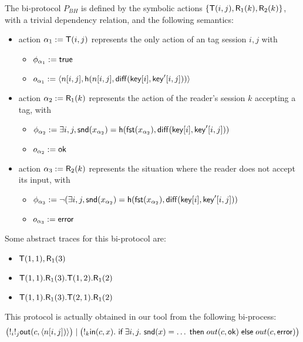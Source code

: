 \begin{example}
  \label{ex:basic-hash-bi-process}
  The bi-protocol $P_{BH}$ is defined by the symbolic actions
  $\{\textsf{T}(i,j),\textsf{R}_1(k),\textsf{R}_2(k)\}$, with a trivial dependency relation,
  and the following semantics:
    \begin{itemize}
      \item action $\alpha_1 := \textsf{T}(i,j)$ represents the only
        action of an tag session $i,j$ with
        \begin{itemize}
          \item $\phi_{\alpha_1} := \textsf{true}$
          \item $o_{\alpha_1} := \langle n[i,j], \mathsf{h}(n[i,j],\mathsf{diff}(\mathsf{key}[i],\mathsf{key}'[i,j])) \rangle$
        \end{itemize}
      \item action $\alpha_2 := \textsf{R}_1(k)$ represents the action
        of the reader's session $k$ accepting a tag, with
        \begin{itemize}
          \item $\phi_{\alpha_2} := \exists i,j, \mathsf{snd}(x_{\alpha_2}) =
            \mathsf{h}(\mathsf{fst}(x_{\alpha_2}),\mathsf{diff}(\mathsf{key}[i],\mathsf{key}'[i,j]))$
          \item $o_{\alpha_2} := \mathsf{ok}$
        \end{itemize}
      \item action $\alpha_3 := \textsf{R}_2(k)$ represents the situation
        where the reader does not accept its input, with
        \begin{itemize}
          \item $\phi_{\alpha_3} := \neg (\exists i,j, \mathsf{snd}(x_{\alpha_2}) =  \mathsf{h}(\mathsf{fst}(x_{\alpha_2}),\mathsf{diff}(\mathsf{key}[i],\mathsf{key}'[i,j]))$
          \item $o_{\alpha_3} := \mathsf{error}$
        \end{itemize}
    \end{itemize}
  Some abstract traces for this bi-protocol are:
  \begin{itemize}
    \item $\textsf{T}(1,1),\textsf{R}_1(3)$
    \item $\textsf{T}(1,1).\textsf{R}_1(3).\textsf{T}(1,2).\textsf{R}_1(2)$
    \item $\textsf{T}(1,1).\textsf{R}_1(3).\textsf{T}(2,1).\textsf{R}_1(2)$
  \end{itemize}
  This protocol is actually obtained in our tool from the following
  bi-process:
  $$\bigl(!_i !_j \mathsf{out}(c,\langle  n[i,j]) \rangle\bigr) \mid
   \bigl(!_k \mathsf{in}(c,x).~ \textsf{if}\; \exists i,j.~ \mathsf{snd}(x) = \ldots \;\textsf{then}\;
    out(c,\mathsf{ok}) \;\textsf{else}\; out(c,\mathsf{error})\bigr)$$
\end{example}

